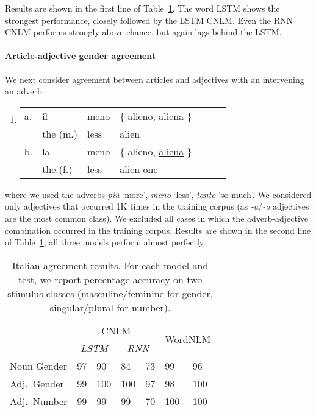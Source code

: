 Results are shown in the first line of
Table~\ref{tab:ital-agr-results}.  The word LSTM shows the strongest
performance, closely followed by the LSTM CNLM.  Even the RNN CNLM
performs strongly above chance, but again lags behind the LSTM.

\paragraph{Article-adjective gender agreement}
We next consider agreement between articles and adjectives with an intervening an adverb:
\begin{enumerate}[label={(\arabic*)}]
	\item 
		\begin{tabular}[t]{lllllll}
	a. & il & meno & \{ \underline{alieno}, aliena \} \\
   &  the (m.)& less & alien  \\
	b. & la & meno & \{ alieno, \underline{aliena} \} \\
    &the (f.)& less & alien one \\
\end{tabular}
\end{enumerate}
where we used the adverbs \emph{pi{\`u}} `more', \emph{meno} `less',
\emph{tanto} `so much'. We considered only adjectives that occurred 1K
times in the training corpus (as \emph{-a}/\emph{-o} adjectives are
the most common class). We excluded all cases in which the
adverb-adjective combination occurred in the training corpus. %
Results are shown in the second line of Table~\ref{tab:ital-agr-results}; all three models perform almost perfectly.

\begin{table}[t]
  \begin{center}
    \begin{tabular}{l|ll|ll|ll}
	    & \multicolumn{4}{c|}{CNLM} & \multicolumn{2}{c}{\multirow{2}{*}{WordNLM}}\\
	    &\multicolumn{2}{c|}{\emph{LSTM}}&\multicolumn{2}{c|}{\emph{RNN}} &\\ \hline
	    Noun Gender & 97&90  & 84&73 & 99&96 \\
	    Adj.~Gender & 99&100 & 100&97 & 98&100 \\
	    Adj.~Number & 99&99 & 99&70 & 100&100 \\
    \end{tabular}
  \end{center}
	\caption{\label{tab:ital-agr-results} Italian agreement results. For each model and test, we report percentage accuracy on two stimulus classes (masculine/feminine for gender, singular/plural for number).}
\end{table}

